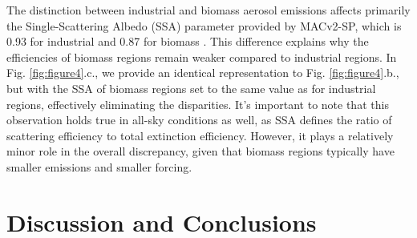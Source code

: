 \documentclass[draft]{agujournal2019}
\begin{document}
            The distinction between industrial and biomass aerosol emissions affects primarily the Single-Scattering Albedo (SSA) parameter provided by MACv2-SP, which is 0.93 for industrial and 0.87 for biomass \cite{Stevens_2017}. This difference explains why the efficiencies of biomass regions remain weaker compared to industrial regions. In Fig. \ref{fig:figure4}.c., we provide an identical representation to Fig. \ref{fig:figure4}.b., but with the SSA of biomass regions set to the same value as for industrial regions, effectively eliminating the disparities.
            It's important to note that this observation holds true in all-sky conditions as well, as SSA defines the ratio of scattering efficiency to total extinction efficiency. However, it plays a relatively minor role in the overall discrepancy, given that biomass regions typically have smaller emissions and smaller forcing.

\section{Discussion and Conclusions}
      




%
%

%
%
%
%
%
%
%
%
\end{document}
